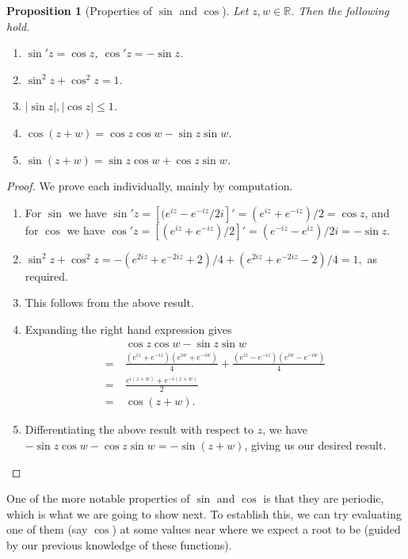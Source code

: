 \documentclass[11pt, a4paper]{article}
\newtheorem{proposition}[theorem]{Proposition}
\theoremstyle{definition}
\newcommand{\R}{\mathbb{R}}
\begin{document}
\begin{proposition}[Properties of $\sin$ and $\cos$]
	Let $z, w \in \R$. Then the following hold.
	\begin{enumerate}[label=(\roman*)]
		\item $\sin' z = \cos z$, $\cos' z = -\sin z$.
		\item $\sin^2 z + \cos^2 z = 1$.
		\item $|\sin z|, |\cos z| \leq 1$.
		\item $\cos(z + w) = \cos z \cos w - \sin z \sin w$.
		\item $\sin(z + w) = \sin z \cos w + \cos z \sin w$.
	\end{enumerate}
\end{proposition}
\begin{proof}
	We prove each individually, mainly by computation.
	\begin{enumerate}[label=(\roman*)]
		\item For $\sin$ we have $\sin' z = \left[(e^{iz} - e^{-iz}/2i\right]' = (e^{iz} + e^{-iz})/2 = \cos z$, and for $\cos$ we have $\cos' z = \left[(e^{iz} + e^{-iz})/2\right]' = (e^{-iz} - e^{iz})/2i = -\sin z$.
		\item
		$
		\sin^2 z + \cos^2 z = -(e^{2iz} + e^{-2iz} + 2)/4 + (e^{2iz} + e^{-2iz} - 2)/4 = 1,
		$
		as required.
		\item This follows from the above result.
		\item Expanding the right hand expression gives 
		\begin{align*}
				&\cos z \cos w-\sin z \sin w \\
				=\ &\frac{\left(e^{i z}+e^{-i z}\right)\left(e^{i w}+e^{-i w}\right)}{4}+\frac{\left(e^{i z}-e^{-i z}\right)\left(e^{i w}-e^{-i w}\right)}{4} \\
				=\ &\frac{e^{i(z+w)}+e^{-i(z+w)}}{2} \\
				=\ &\cos (z+w).
		\end{align*}
		\item Differentiating the above result with respect to $z$, we have $-\sin z \cos w - \cos z \sin w = - \sin (z + w)$, giving us our desired result. \qedhere
	\end{enumerate}
\end{proof}

One of the more notable properties of $\sin$ and $\cos$ is that they are periodic, which is what we are going to show next. To establish this, we can try evaluating one of them (say $\cos$) at some values near where we expect a root to be (guided by our previous knowledge of these functions).
\end{document}
